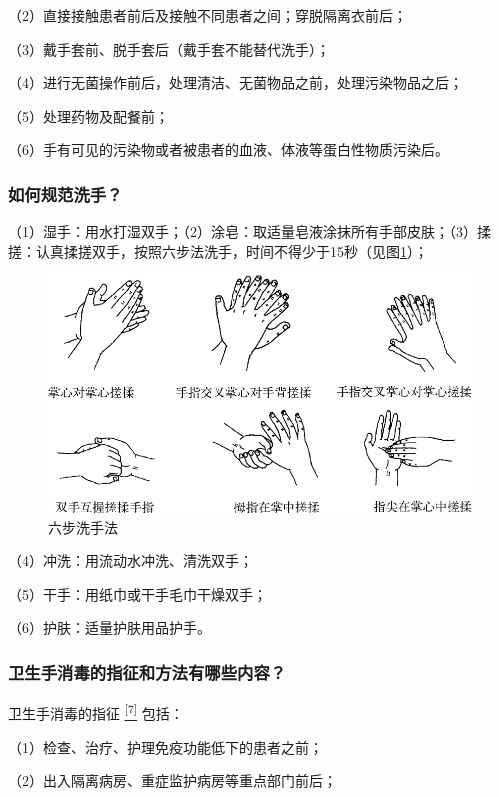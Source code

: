 （2）直接接触患者前后及接触不同患者之间；穿脱隔离衣前后；

（3）戴手套前、脱手套后（戴手套不能替代洗手）；

（4）进行无菌操作前后，处理清洁、无菌物品之前，处理污染物品之后；

（5）处理药物及配餐前；

（6）手有可见的污染物或者被患者的血液、体液等蛋白性物质污染后。

\subsubsection{如何规范洗手？}

（1）湿手：用水打湿双手；（2）涂皂：取适量皂液涂抹所有手部皮肤；（3）揉搓：认真揉搓双手，按照六步法洗手，时间不得少于15秒（见图\ref{fig25-1}）；

\begin{figure}[!htbp]
 \centering
 \includegraphics{./images/Image00290.jpg}
 \captionsetup{justification=centering}
 \caption{六步洗手法}
 \label{fig25-1}
  \end{figure} 

（4）冲洗：用流动水冲洗、清洗双手；

（5）干手：用纸巾或干手毛巾干燥双手；

（6）护肤：适量护肤用品护手。

\subsubsection{卫生手消毒的指征和方法有哪些内容？}

卫生手消毒的指征
\protect\hyperlink{text00031.htmlux5cux23ch7-30}{\textsuperscript{{[}7{]}}}
包括：

（1）检查、治疗、护理免疫功能低下的患者之前；

（2）出入隔离病房、重症监护病房等重点部门前后；

